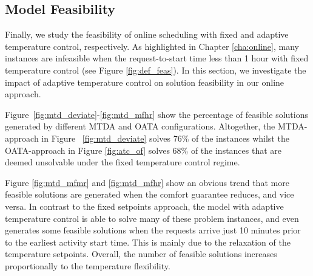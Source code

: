 \subsection{Model Feasibility} \label{sec:feasibility}

Finally, we study the feasibility of online scheduling with fixed and adaptive temperature control, respectively. As highlighted in Chapter \ref{cha:online}, many instances are infeasible when the request-to-start time less than 1 hour with fixed temperature control (see Figure \ref{fig:def_feas}). In this section, we investigate the impact of adaptive temperature control on solution feasibility in our online approach.

Figure~\ref{fig:mtd_deviate}-\ref{fig:mtd_mfhr} show the percentage of feasible solutions generated by different MTDA and OATA configurations. 
Altogether, the MTDA-approach in Figure ~\ref{fig:mtd_deviate} solves 76\% of the instances whilst the OATA-approach in Figure \ref{fig:atc_of} solves 68\% of the instances that are deemed unsolvable under the fixed temperature control regime. 

Figure \ref{fig:mtd_mfmr} and \ref{fig:mtd_mfhr} show an obvious trend that more feasible solutions are generated when the comfort guarantee reduces, and vice versa. In contrast to the fixed setpoints approach, the model with adaptive temperature control is able to solve many of these problem instances, and even generates some feasible solutions when the requests arrive just 10 minutes prior to the earliest activity start time. This is mainly due to the relaxation of the temperature setpoints. Overall, the number of feasible solutions increases proportionally to the temperature flexibility. 


